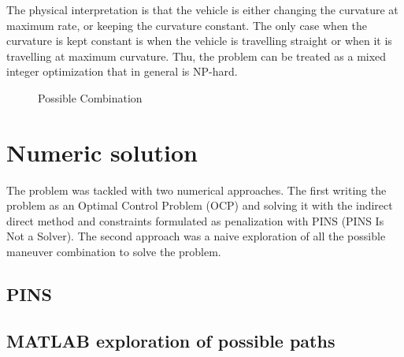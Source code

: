 \documentclass[11pt,twocolumn]{scrartcl}
\begin{document}
The physical interpretation is that the vehicle is either changing the curvature at maximum rate, or keeping the curvature constant.
The only case when the curvature is kept constant is when the vehicle is travelling straight or when it is travelling at maximum curvature.
Thu, the problem can be treated as a mixed integer optimization that in general is NP-hard.


\begin{figure}[ht]
  \centering
  
  \caption{Possible Combination}
  \label{fig:possiblecombination}
\end{figure}


\section*{Numeric solution}

The problem was tackled with two numerical approaches. The first writing the problem as an Optimal Control Problem (OCP) and solving it with the indirect direct method and constraints formulated as penalization with PINS (PINS Is Not a Solver)\cite{biral2016notes}. The second approach was a naive exploration of all the possible maneuver combination to solve the problem.

\subsection*{PINS}

\subsection*{MATLAB exploration of possible paths}




%

%



 
\end{document}

